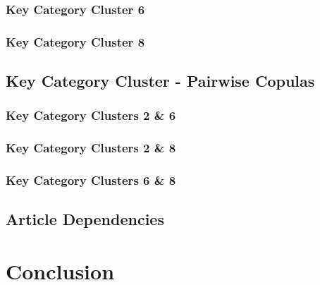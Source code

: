\documentclass[11pt, twoside]{article}
\numberwithin{equation}{section}
\numberwithin{table}{section}
\numberwithin{figure}{section}
\begin{document}
\subsubsection{Key Category Cluster 6} \label{sssec:margin_kcc_6}

\subsubsection{Key Category Cluster 8} \label{sssec:margin_kcc_8}


\subsection{Key Category Cluster - Pairwise Copulas}
\label{ssec:kcc_copulas}


%
\subsubsection{Key Category Clusters 2 \& 6} \label{sssec:kcc_26}

\subsubsection{Key Category Clusters 2 \& 8} \label{sssec:kcc_28}

\subsubsection{Key Category Clusters 6 \& 8} \label{sssec:kcc_68}

\subsection{Article Dependencies} \label{ssec:article_dependencies}

\newpage
\thispagestyle{empty}
\cleardoublepage




\thispagestyle{plain}
\section{Conclusion} \label{sec:conclusion}

\newpage
\thispagestyle{empty}
\cleardoublepage
\end{document}
